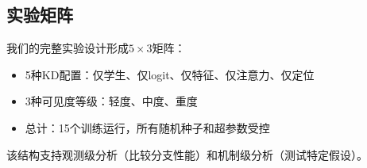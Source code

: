 \subsection{实验矩阵}

我们的完整实验设计形成$5 \times 3$矩阵：
\begin{itemize}
    \item 5种KD配置：仅学生、仅logit、仅特征、仅注意力、仅定位
    \item 3种可见度等级：轻度、中度、重度
    \item 总计：15个训练运行，所有随机种子和超参数受控
\end{itemize}

该结构支持观测级分析（比较分支性能）和机制级分析（测试特定假设）。
